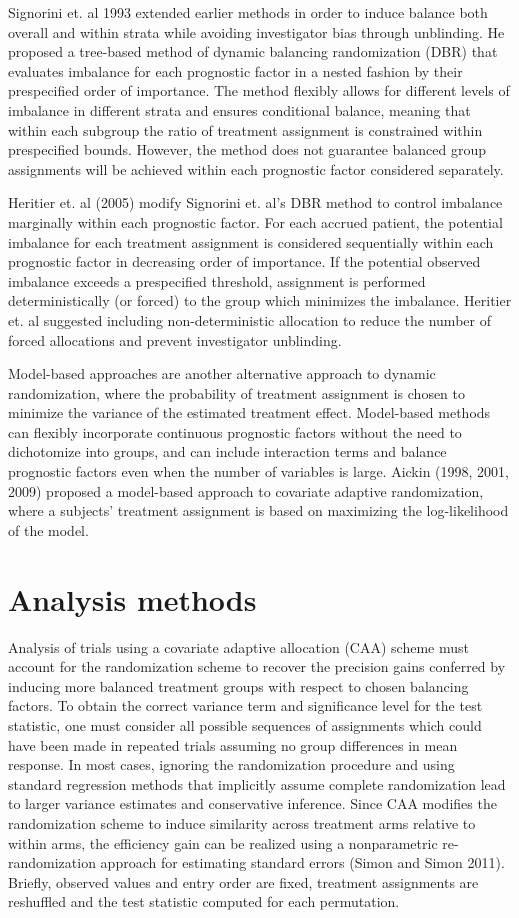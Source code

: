 Signorini et. al 1993 extended earlier methods in order to induce balance both overall and within strata while avoiding investigator bias through unblinding.  
He proposed a tree-based method of dynamic balancing randomization (DBR) that evaluates imbalance for each prognostic factor in a nested fashion by their prespecified order of importance.  
The method flexibly allows for different levels of imbalance in different strata and ensures conditional balance, meaning that within each subgroup the ratio of treatment assignment is constrained within prespecified bounds.  
However, the method does not guarantee balanced group assignments will be achieved within each prognostic factor considered separately. 

Heritier et. al (2005) modify Signorini et. al’s DBR method to control imbalance marginally within each prognostic factor.  
For each accrued patient, the potential imbalance for each treatment assignment is considered sequentially within each prognostic factor in decreasing order of importance.  
If the potential observed imbalance exceeds a prespecified threshold, assignment is performed deterministically (or forced) to the group which minimizes the imbalance.  
Heritier et. al suggested including non-deterministic allocation to reduce the number of forced allocations and prevent investigator unblinding.

Model-based approaches are another alternative approach to dynamic randomization, where the probability of treatment assignment is chosen to minimize the variance of the estimated treatment effect. 
Model-based methods can flexibly incorporate continuous prognostic factors without the need to dichotomize into groups, and can include interaction terms and balance prognostic factors even when the number of variables is large.  
Aickin (1998, 2001, 2009) proposed a model-based approach to covariate adaptive randomization, where a subjects’ treatment assignment is based on maximizing the log-likelihood of the model. 

\section{Analysis methods}
Analysis of trials using a covariate adaptive allocation (CAA) scheme must account for the randomization scheme to recover the precision gains conferred by inducing more balanced treatment groups with respect to chosen balancing factors.  
To obtain the correct variance term and significance level for the test statistic, one must consider all possible sequences of assignments which could have been made in repeated trials assuming no group differences in mean response.  
In most cases, ignoring the randomization procedure and using standard regression methods that implicitly assume complete randomization lead to larger variance estimates and conservative inference. 
Since CAA modifies the randomization scheme to induce similarity across treatment arms relative to within arms, the efficiency gain can be realized using a nonparametric re-randomization approach for estimating standard errors (Simon and Simon 2011).  
Briefly, observed values and entry order are fixed, treatment assignments are reshuffled and the test statistic computed for each permutation.  

